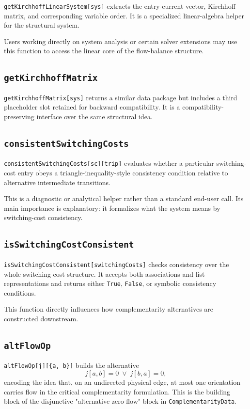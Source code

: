 \documentclass[11pt]{article}
\begin{document}
\texttt{getKirchhoffLinearSystem[sys]} extracts the entry-current vector, Kirchhoff matrix, and corresponding variable order. It is a specialized linear-algebra helper for the structural system.

Users working directly on system analysis or certain solver extensions may use this function to access the linear core of the flow-balance structure.

\subsection*{\texttt{getKirchhoffMatrix}}

\texttt{getKirchhoffMatrix[sys]} returns a similar data package but includes a third placeholder slot retained for backward compatibility. It is a compatibility-preserving interface over the same structural idea.

\subsection*{\texttt{consistentSwitchingCosts}}

\texttt{consistentSwitchingCosts[sc][trip]} evaluates whether a particular switching-cost entry obeys a triangle-inequality-style consistency condition relative to alternative intermediate transitions.

This is a diagnostic or analytical helper rather than a standard end-user call. Its main importance is explanatory: it formalizes what the system means by switching-cost consistency.

\subsection*{\texttt{isSwitchingCostConsistent}}

\texttt{isSwitchingCostConsistent[switchingCosts]} checks consistency over the whole switching-cost structure. It accepts both associations and list representations and returns either \texttt{True}, \texttt{False}, or symbolic consistency conditions.

This function directly influences how complementarity alternatives are constructed downstream.

\subsection*{\texttt{altFlowOp}}

\texttt{altFlowOp[j][\{a, b\}]} builds the alternative
\[
j[a, b] = 0 \;\vee\; j[b, a] = 0,
\]
encoding the idea that, on an undirected physical edge, at most one orientation carries flow in the critical complementarity formulation. This is the building block of the disjunctive "alternative zero-flow" block in \texttt{ComplementarityData}.
\end{document}
